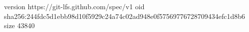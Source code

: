 version https://git-lfs.github.com/spec/v1
oid sha256:244fdc5d1ebb98d10f5929c24a74c02ad948e0f57569776728709434efc1d8b6
size 43840
